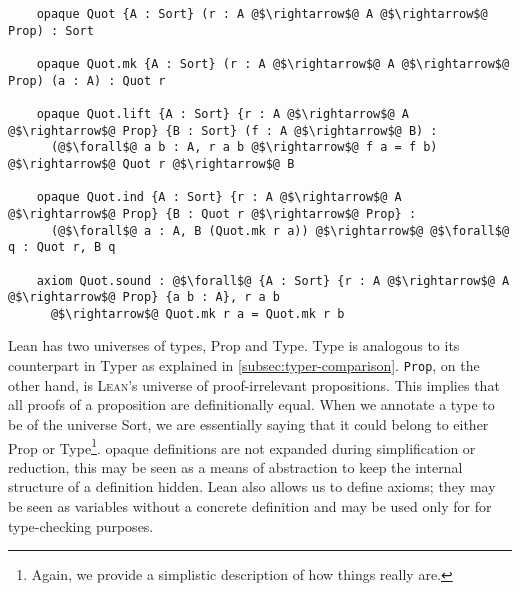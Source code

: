 \documentclass[12pt,twoside,maitrise]{dms}
\theoremstyle{definition}
\numberwithin{equation}{section}
\numberwithin{table}{chapter}
\numberwithin{figure}{chapter}
\newcommand\kw[1] {\textsf{#1}}
\newcommand\id[1] {\texttt{#1}}
\def\Lean{\textsc{Lean}\xspace}
\begin{document}
\begin{verbatim}
    opaque Quot {A : Sort} (r : A @$\rightarrow$@ A @$\rightarrow$@ Prop) : Sort

    opaque Quot.mk {A : Sort} (r : A @$\rightarrow$@ A @$\rightarrow$@ Prop) (a : A) : Quot r

    opaque Quot.lift {A : Sort} {r : A @$\rightarrow$@ A @$\rightarrow$@ Prop} {B : Sort} (f : A @$\rightarrow$@ B) :
      (@$\forall$@ a b : A, r a b @$\rightarrow$@ f a = f b) @$\rightarrow$@ Quot r @$\rightarrow$@ B

    opaque Quot.ind {A : Sort} {r : A @$\rightarrow$@ A @$\rightarrow$@ Prop} {B : Quot r @$\rightarrow$@ Prop} :
      (@$\forall$@ a : A, B (Quot.mk r a)) @$\rightarrow$@ @$\forall$@ q : Quot r, B q

    axiom Quot.sound : @$\forall$@ {A : Sort} {r : A @$\rightarrow$@ A @$\rightarrow$@ Prop} {a b : A}, r a b
      @$\rightarrow$@ Quot.mk r a = Quot.mk r b
\end{verbatim}

Lean has two universes of types, \kw{Prop} and \kw{Type}. \kw{Type} is analogous
to its counterpart in Typer as explained in \autoref{subsec:typer-comparison}.
\id{Prop}, on the other hand, is \Lean{}'s universe of proof-irrelevant
propositions. This implies that all proofs of a proposition are definitionally
equal. When we annotate a type to be of the universe \kw{Sort}, we are
essentially saying that it could belong to either \kw{Prop} or
\kw{Type}\footnote{Again, we provide a simplistic description of how things
really are.}. \kw{opaque} definitions are not expanded during simplification or
reduction, this may be seen as a means of abstraction to keep the internal
structure of a definition hidden. Lean also allows us to define \kw{axiom}s;
they may be seen as variables without a concrete definition and may be
used only for for type-checking purposes.
\end{document}
